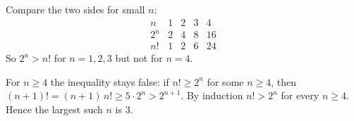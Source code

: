 Compare the two sides for small $n$:
\[
\begin{array}{c|cccc}
n&1&2&3&4\\\hline
2^n&2&4&8&16\\
n!&1&2&6&24
\end{array}
\]
So $2^n>n!$ for $n=1,2,3$ but not for $n=4$.

For $n\ge4$ the inequality stays false: if $n!\ge2^n$ for some $n\ge4$, then $(n+1)!=(n+1)\,n!\ge 5\cdot2^n>2^{n+1}$. By induction $n!>2^n$ for every $n\ge4$. Hence the largest such $n$ is $\boxed{3}$.
